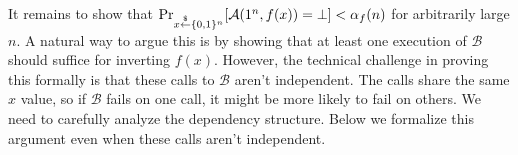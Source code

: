 It remains to show that $\Pr_{x \stackrel{\$}{\leftarrow} \{0,1\}^{n}}[ \mathcal{A}(1^n, f(x)) = \bot] < \alpha_f(n)$ for arbitrarily large $n$. A natural way to argue this is by showing that at least one execution of $\mathcal{B}$ should suffice for inverting $f(x)$. However, the technical challenge in proving this formally is that these calls to $\mathcal{B}$ aren't independent. The calls share the same $x$ value, so if $\mathcal{B}$ fails on one call, it might be more likely to fail on others. We need to carefully analyze the dependency structure. Below we formalize this argument even when these calls aren't independent.

